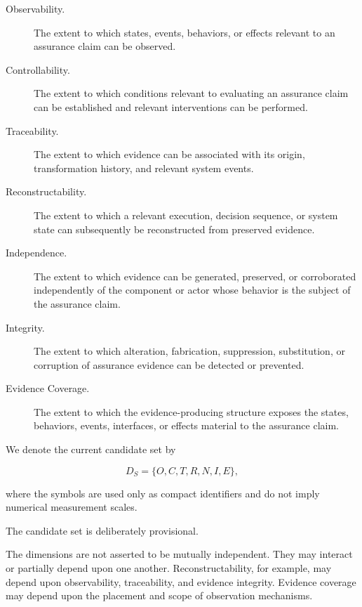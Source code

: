 \begin{description}
  \item[Observability.]
        The extent to which states, events, behaviors, or effects relevant
        to an assurance claim can be observed.

  \item[Controllability.]
        The extent to which conditions relevant to evaluating an assurance
        claim can be established and relevant interventions can be performed.

  \item[Traceability.]
        The extent to which evidence can be associated with its origin,
        transformation history, and relevant system events.

  \item[Reconstructability.]
        The extent to which a relevant execution, decision sequence,
        or system state can subsequently be reconstructed from preserved evidence.

  \item[Independence.]
        The extent to which evidence can be generated, preserved, or
        corroborated independently of the component or actor whose behavior
        is the subject of the assurance claim.

  \item[Integrity.]
        The extent to which alteration, fabrication, suppression,
        substitution, or corruption of assurance evidence can be detected
        or prevented.

  \item[Evidence Coverage.]
        The extent to which the evidence-producing structure exposes
        the states, behaviors, events, interfaces, or effects material
        to the assurance claim.
\end{description}

We denote the current candidate set by

\begin{equation}
  D_S =
  \{
  O,C,T,R,N,I,E
  \},
  \label{eq:structural-dimensions}
\end{equation}

where the symbols are used only as compact identifiers and do not
imply numerical measurement scales.

The candidate set is deliberately provisional.

The dimensions are not asserted to be mutually independent.
They may interact or partially depend upon one another.
Reconstructability, for example, may depend upon observability,
traceability, and evidence integrity.
Evidence coverage may depend upon the placement and scope
of observation mechanisms.

